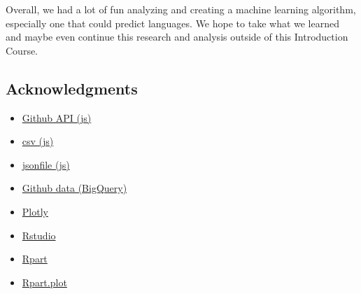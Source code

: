 \documentclass[11pt]{article}
\providecommand{\tightlist}{%
      \setlength{\itemsep}{0pt}\setlength{\parskip}{0pt}}
\begin{document}
Overall, we had a lot of fun analyzing and creating a machine learning
algorithm, especially one that could predict languages. We hope to take
what we learned and maybe even continue this research and analysis
outside of this Introduction Course.

    \hypertarget{acknowledgments}{%
\subsection{Acknowledgments}\label{acknowledgments}}

\begin{itemize}
\tightlist
\item
  \href{https://github.com/octokit/rest.js}{Github API (js)}
\item
  \href{https://www.npmjs.com/package/csv}{csv (js)}
\item
  \href{https://www.npmjs.com/package/jsonfile}{jsonfile (js)}
\item
  \href{https://bigquery.cloud.google.com/dataset/bigquery-public-data:github_repos}{Github
  data (BigQuery)}
\item
  \href{https://plot.ly/python/}{Plotly}
\item
  \href{https://www.rstudio.com/}{Rstudio}
\item
  \href{https://cran.r-project.org/web/packages/rpart/index.html}{Rpart}
\item
  \href{https://cran.r-project.org/web/packages/rpart.plot/index.html}{Rpart.plot}
\end{itemize}


    
    
    
    
\end{document}
